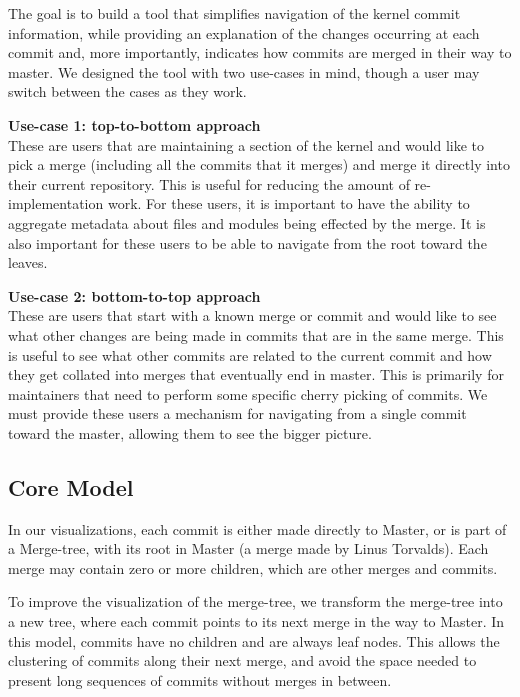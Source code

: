 \documentclass[conference, draftclsnofoot, draft]{IEEEtran}
\begin{document}
The goal is to build a tool that simplifies  navigation of the kernel commit information, while providing an explanation of the changes occurring at each commit
and, more importantly, indicates how commits are merged in their way to master.
We designed the tool with two use-cases in mind, though a user may switch
between the cases as they work.

\noindent \textbf{Use-case 1: top-to-bottom approach}\label{sec:usecase1}\\
These are users that are maintaining a section of the kernel and would like to pick
a merge (including all the commits that it merges) and merge it directly into their current repository. This is useful for
reducing the amount of re-implementation work. For these users, it is important to have the
ability to aggregate metadata about files and modules being effected by the merge.
It is also important for these users to be able to navigate from the root toward the
leaves.

\noindent \textbf{Use-case 2: bottom-to-top approach}\label{sec:usecase2}\\
These are users that start with a known merge or commit and would like to see what
other changes are being made in commits that are in the same merge. This is useful
to see what other commits are related to the current commit and how they get collated into merges that eventually end in master.
 This is primarily for maintainers that need to perform
some specific cherry picking of commits. We
must provide these users a mechanism for navigating from a single commit toward the
master, allowing them to see the bigger picture.

\subsection{Core Model}

In our visualizations, each commit is either made directly to Master, or is part of a Merge-tree, with its root in Master (a merge made by Linus Torvalds). Each merge may contain zero or more
children, which are other merges and commits. 

To improve the visualization of the merge-tree, we transform the merge-tree into a new tree, where each commit points to its next merge in the way to Master. In
this model, commits have no children and are always leaf nodes. This allows the clustering of commits along their next merge, and avoid the space needed to
present long sequences of commits without merges in between.
\end{document}
